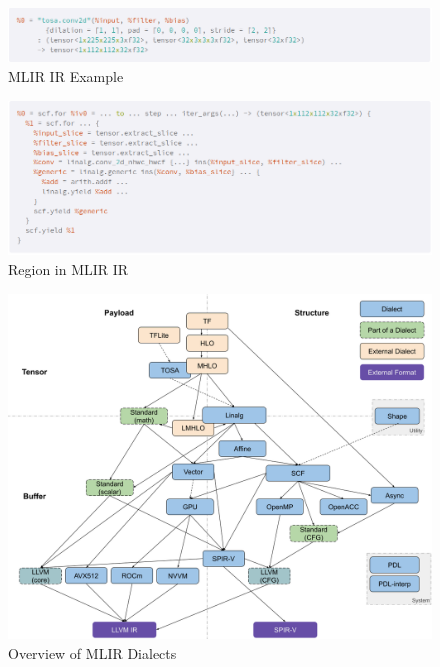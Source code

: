 \begin{figure}
    \centering
    \includegraphics[width=1.\linewidth]{figures/MLIR_IR_design.png}
    \caption{MLIR IR Example}
    \label{fig:mlir_ir_design}
\end{figure}

\begin{figure}
    \centering
    \includegraphics[width=1.\linewidth]{figures/MLIR_IR_region.png}
    \caption{Region in MLIR IR}
    \label{fig:mlir_ir_region}
\end{figure}

\begin{figure}
    \centering
    \includegraphics[width=0.8\linewidth]{figures/MLIR_dialect_overview.png}
    \caption{Overview of MLIR Dialects}
    \label{fig:mlir_dialects_overview}
\end{figure}

